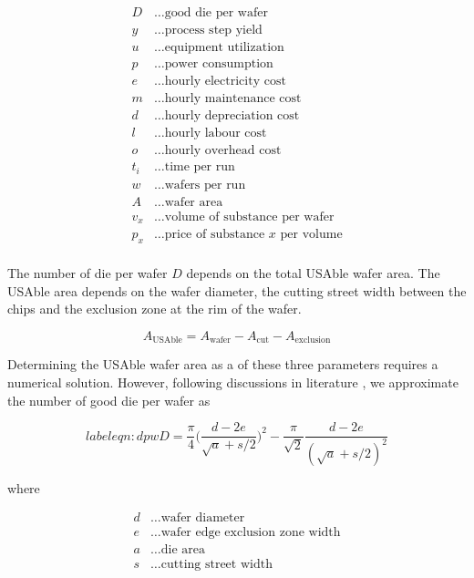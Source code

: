 \documentclass[10pt]{article}
\begin{document}
\begin{align*}
        D &\dots \text{good die per wafer} \label{def:cost_wafer_first} \\
        y &\dots \text{process step yield} \\
        u &\dots \text{equipment utilization} \\
        p &\dots \text{power consumption} \\
        e &\dots \text{hourly electricity cost} \\
        m &\dots \text{hourly maintenance cost} \\
        d &\dots \text{hourly depreciation cost}\\
        l &\dots \text{hourly labour cost} \\
        o &\dots \text{hourly overhead cost} \\
        t_i &\dots \text{time per run} \\
        w &\dots \text{wafers per run} \\
        A &\dots \text{wafer area} \\
        v_x &\dots \text{volume of substance per wafer} \\
        p_x &\dots \text{price of substance $x$ per volume}\\
\end{align*}

The number of die per wafer $D$ depends on the total USAble wafer area. The USAble area depends on the wafer diameter, the cutting street width between the chips and the exclusion zone at the rim of the wafer.

\begin{equation}
	A_{\text{USAble}}=A_{\text{wafer}}-A_{\text{cut}}-A_{\text{exclusion}}
\end{equation}

Determining the USAble wafer area as a of these three parameters requires a numerical solution. However, following discussions in literature \cite{de2005investigation}, we approximate the number of good die per wafer as

\begin{equation}
label{eqn:dpw}
	D=\frac{\pi}{4}  \bigg ( \frac{d-2e}{\sqrt{a}+s/2} \bigg ) ^2 - \frac{\pi}{\sqrt{2}}\frac{d-2e}{(\sqrt{a}+s/2)^2}
\end{equation}

where

\begin{align*}
    d &\dots \text{wafer diameter} \\
    e &\dots \text{wafer edge exclusion zone width} \\
    a &\dots \text{die area} \\
    s &\dots \text{cutting street width} \\
\end{align*}
\end{document}
